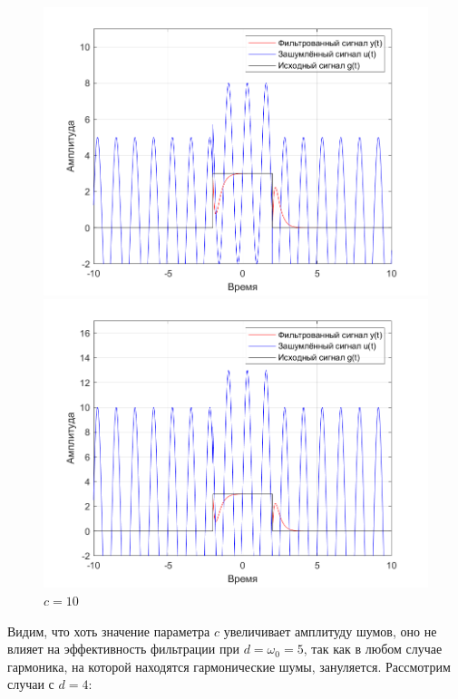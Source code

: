 \documentclass[a4paper]{article}
\begin{document}
\begin{figure}[H]
    \begin{minipage}{0.5\textwidth}
        \centering
        \includegraphics[width=\linewidth]{ex1_2/a1=0_a2=25_b1=10.5_b2=25_d=5_c=5/h2.png}
        \caption{$c=5$}
    \end{minipage}
    \begin{minipage}{0.5\textwidth}
        \centering
        \includegraphics[width=\linewidth]{ex1_2/a1=0_a2=25_b1=10.5_b2=25_d=5_c=10/h2.png}
        \caption{$c=10$}
    \end{minipage}
\end{figure}

Видим, что хоть значение параметра $c$ увеличивает амплитуду шумов, оно не влияет на эффективность фильтрации при $d = \omega_0 = 5$, так как в любом случае гармоника, на которой находятся гармонические шумы, зануляется. Рассмотрим случаи с $d = 4$:
\end{document}
